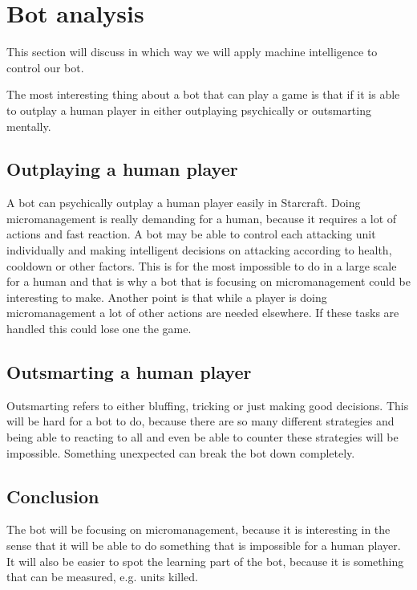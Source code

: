 \section{Bot analysis}
	This section will discuss in which way we will apply machine intelligence to control our bot.
	
	The most interesting thing about a bot that can play a game is that if it is able to outplay a 
	human player in either outplaying psychically or outsmarting mentally. 
	
	\subsection*{Outplaying a human player}
		A bot can psychically outplay a human player easily in Starcraft. 
		Doing micromanagement is really demanding for a human, because it requires a lot of actions and fast reaction. A bot may be able to control each 
		attacking unit individually and making intelligent decisions on attacking according to health, cooldown or other factors. This is for the most 
		impossible to do in a large scale for a human and that is why a bot that is focusing on micromanagement could be interesting to make. Another point 
		is that while a player is doing micromanagement a lot of other actions are needed elsewhere. If these tasks are handled this could lose one the game.
		
	\subsection*{Outsmarting a human player}
		Outsmarting refers to either bluffing, tricking or just making good decisions. This will be hard for a bot to do, because there are so many 
		different strategies and being able to reacting to all and even be able to counter these strategies will be impossible. Something unexpected 
		can break the bot down completely.
		
	\subsection*{Conclusion}
		The bot will be focusing on micromanagement, because it is interesting in the sense that it will be able to do something that is impossible for a 
		human player. It will also be easier to spot the learning part of the bot, because it is something that can be measured, e.g. units killed.
	